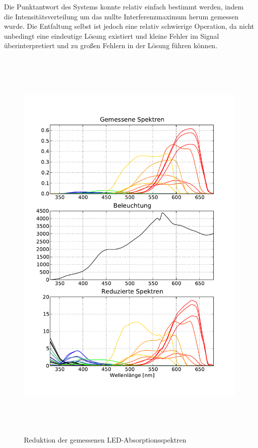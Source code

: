 \documentclass[11pt]{scrartcl}
\begin{document}
Die Punktantwort des Systems konnte relativ einfach bestimmt werden, indem die Intensitätsverteilung um das nullte Interferenzmaximum herum gemessen wurde.
Die Entfaltung selbst ist jedoch eine relativ schwierige Operation, da nicht unbedingt eine eindeutige Lösung existiert und kleine Fehler im Signal überinterpretiert und zu großen Fehlern in der Lösung führen können.

\begin{figure}[H]
\begin{center}
\includegraphics[height=20cm]{spektren_mit_halogen.pdf}
\end{center}
\vspace{-1.5\baselineskip}
\caption{Reduktion der gemessenen LED-Absorptionsspektren}
\label{fig:reduktion}
\end{figure}
\end{document}
